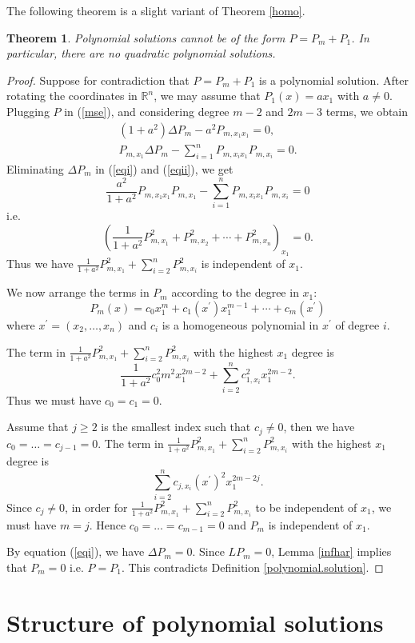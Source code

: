 \documentclass[pdflatex,sn-mathphys-num]{sn-jnl}%
\theoremstyle{thmstyleone}%
\newtheorem{theorem}{Theorem}[section]%
\theoremstyle{thmstyletwo}%
\theoremstyle{thmstylethree}%
\newcommand{\R}{\mathbb{R}}
\begin{document}
The following theorem is a slight variant of Theorem \ref{homo}.
\begin{theorem}\label{nodeg2} 
	Polynomial solutions cannot be of the form $P=P_m+P_1$.
	In particular, there are no quadratic polynomial solutions.
\end{theorem}

\begin{proof}
	Suppose for contradiction that $P=P_m+P_1$ is a polynomial solution. After rotating the coordinates in $\R^n$, we may assume that $P_1(x)=ax_1$ with $a\neq 0$. Plugging $P$ in (\ref{mse}), and considering degree $m-2$ and $2m-3$ terms, we obtain
	\begin{align}
		(1+a^2)\Delta P_m-a^2 P_{m, x_1x_1}=0, \label{eqi}\\
		P_{m, x_1} \Delta P_m-\sum_{i=1}^n P_{m,x_i x_1}P_{m,x_i}=0.\label{eqii}
	\end{align}
	Eliminating $\Delta P_m$ in (\ref{eqi}) and (\ref{eqii}), we get
	\[\frac{a^2}{1+a^2}P_{m, x_1x_1}P_{m, x_1} -\sum_{i=1}^n P_{m,x_i x_1}P_{m,x_i}=0\]
	i.e.
	\[\left(\frac{1}{1+a^2}P_{m,x_1}^2+P_{m,x_2}^2+\cdots +P_{m,x_n}^2\right)_{x_1}=0.\]
	Thus we have $\frac{1}{1+a^2}P_{m,x_1}^2+\sum_{i=2}^nP_{m,x_i}^2$ is independent of $x_1$. 
	
	We now arrange the terms in $P_m$ according to the degree in $x_1$:
	\[P_m(x)=c_0x_1^m +c_{1}(x^\prime)x_1^{m-1}+\cdots+c_m(x^\prime)\]
	where $x^\prime=(x_2,\dots,x_n)$ and $c_i$ is a homogeneous polynomial in $x^\prime$ of degree $i$.
	
	The term in $\frac{1}{1+a^2}P_{m,x_1}^2+\sum_{i=2}^nP_{m,x_i}^2$ with the highest $x_1$ degree is 
	\[\frac{1}{1+a^2}c_0^2m^2x_1^{2m-2}+\sum_{i=2}^n c_{1,x_i}^2x_1^{2m-2}.\]
	Thus we must have $c_0=c_1=0$.
	
	Assume that $j\ge 2$ is the smallest index such that $c_j\neq 0$, then we have $c_0=\dots=c_{j-1}=0$. The term in $\frac{1}{1+a^2}P_{m,x_1}^2+\sum_{i=2}^nP_{m,x_i}^2$ with the highest $x_1$ degree is 
	\[\sum_{i=2}^{n}c_{j,x_i}(x^\prime)^2x_1^{2m-2j}.\]
	Since $c_j\neq 0$, in order for $\frac{1}{1+a^2}P_{m,x_1}^2+\sum_{i=2}^nP_{m,x_i}^2$ to be independent of $x_1$, we must have $m=j$. Hence $c_0=\dots=c_{m-1}=0$ and $P_m$ is independent of $x_1$.
	
	By equation (\ref{eqi}), we have $\Delta P_m=0$. Since $LP_m=0$, Lemma \ref{infhar} implies that $P_m=0$ i.e. $P=P_1$. This contradicts Definition \ref{polynomial.solution}.
\end{proof}
\section{Structure of polynomial solutions}
\label{3}
\end{document}
